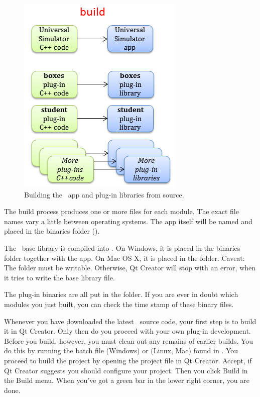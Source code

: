 \begin{figure}
\centering
\includegraphics[scale=0.8]{graphics/workflow-build}
\caption{Building the \US\ app and plug-in libraries from source.}
\label{fig:workflow-build}
\end{figure}

The build process produces one or more files for each module. The exact file names vary a little between operating systems. The app itself will be named  and placed in the binaries folder (). 

The \US\ base library is compiled into . On Windows, it is placed in the binaries folder together with the app. On Mac OS X, it is placed in the  folder. Caveat: The  folder must be writable. Otherwise, Qt Creator will stop with an error, when it tries to write the base library file.

The plug-in binaries are all put in the  folder. If you are ever in doubt which modules you just built, you can check the time stamp of these binary files.

Whenever you have downloaded the latest \US\ source code, your first step is to build it in Qt Creator. Only then do you proceed with your own plug-in development. Before you build, however, you must clean out any remains of earlier builds. You do this by running the batch file  (Windows) or  (Linux, Mac) found in \devhome. You proceed to build the project by opening the  project file in Qt Creator. Accept, if Qt Creator suggests you should configure your project. Then you click Build in the Build menu. When you've got a green bar in the lower right corner, you are done. 

